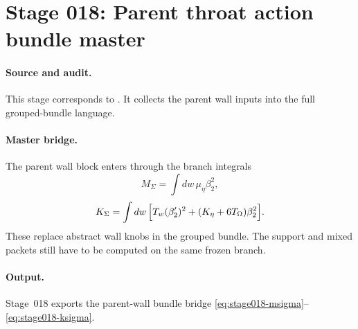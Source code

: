 \section[Stage 018]{Stage 018: Parent throat action bundle master}
\label{stage:018}


\paragraph{Source and audit.}
This stage corresponds to
.
It collects the parent wall inputs into the full grouped-bundle language.

\paragraph{Master bridge.}
The parent wall block enters through the branch integrals
\begin{equation}
\label{eq:stage018-msigma}
M_\Sigma=\int dw\,\mu_\eta\beta_2^2,
\end{equation}
\begin{equation}
\label{eq:stage018-ksigma}
K_\Sigma=\int dw\,\Bigl[T_w(\beta_2')^2+
(K_\eta+6T_\Omega)\beta_2^2\Bigr].
\end{equation}
These replace abstract wall knobs in the grouped bundle.  The support and
mixed packets still have to be computed on the same frozen branch.

\paragraph{Output.}
Stage~018 exports the parent-wall bundle bridge
\eqref{eq:stage018-msigma}--\eqref{eq:stage018-ksigma}.
